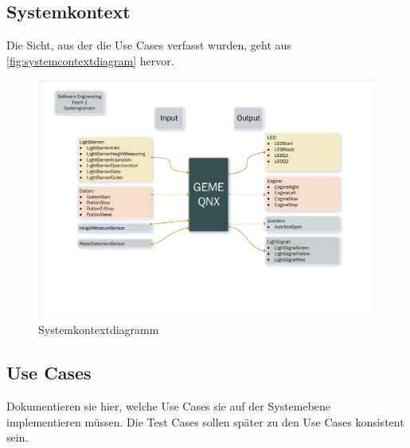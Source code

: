 \subsection{Systemkontext}

Die Sicht, aus der die Use Cases verfasst wurden, geht aus
\autoref{fig:systemcontextdiagram} hervor.

\begin{figure}
    \centering
    \includegraphics[width=\textwidth]{figures/systemcontext.pdf}
    \caption{Systemkontextdiagramm}
    \label{fig:systemcontextdiagram}
\end{figure}

\subsection{Use Cases}

Dokumentieren sie hier, welche Use Cases sie auf der Systemebene
implementieren müssen. Die Test Cases sollen später zu den Use Cases
konsistent sein.

